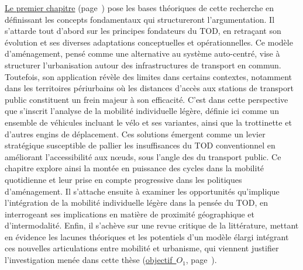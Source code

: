 \begin{refsegment}
\hyperref[chap1:titre]{Le premier chapitre} (page~\pageref{chap1:titre}) pose les bases théoriques de cette recherche en définissant les concepts fondamentaux qui structureront l’argumentation. Il s’attarde tout d’abord sur les principes fondateurs du \acrshort{TOD}, en retraçant son évolution et ses diverses adaptations conceptuelles et opérationnelles. Ce modèle d’aménagement, pensé comme une alternative au système auto-centré, vise à structurer l’urbanisation autour des infrastructures de transport en commun. Toutefois, son application révèle des limites dans certains contextes, notamment dans les territoires périurbains où les distances d’accès aux stations de transport public constituent un frein majeur à son efficacité. C’est dans cette perspective que s’inscrit l’analyse de la mobilité individuelle légère, définie ici comme un ensemble de véhicules incluant le vélo et ses variantes, ainsi que la trottinette et d’autres engins de déplacement. Ces solutions émergent comme un levier stratégique susceptible de pallier les insuffisances du \acrshort{TOD} conventionnel en améliorant l’accessibilité aux nœuds, sous l'angle des  du transport public. Ce chapitre explore ainsi la montée en puissance des cycles dans la mobilité quotidienne et leur prise en compte progressive dans les politiques d’aménagement. Il s’attache ensuite à examiner les opportunités qu’implique l’intégration de la mobilité individuelle légère dans la pensée du \acrshort{TOD}, en interrogeant ses implications en matière de proximité géographique et d’intermodalité. Enfin, il s’achève sur une revue critique de la littérature, mettant en évidence les lacunes théoriques et les potentiels d’un modèle élargi intégrant ces nouvelles articulations entre mobilité et urbanisme, qui viennent justifier l’investigation menée dans cette thèse (\hyperref[objectif-1]{objectif~\(O_1\)}, page~\pageref{objectif-1}).%


\end{refsegment}
